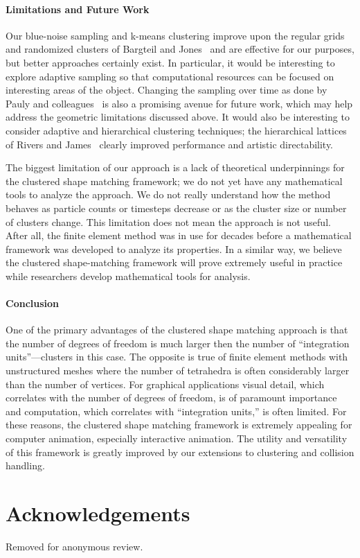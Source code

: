 \documentclass[review]{acmsiggraph}
\begin{document}
\paragraph{Limitations and Future Work}

Our blue-noise sampling and k-means clustering improve upon the regular grids and
randomized clusters of Bargteil and Jones~ and are effective for our purposes,
but better approaches certainly exist.  In particular, it would be interesting to explore adaptive sampling
so that computational resources can be focused on interesting areas of the object.  
Changing the sampling over time as done by Pauly and colleagues~
is also a promising avenue for future work, which may help address the geometric limitations discussed above.
It would also be interesting
to consider adaptive and hierarchical clustering techniques; the hierarchical lattices of Rivers and James~\cite{Rivers:2007:FFL}
clearly improved performance and artistic directability.  

The biggest limitation of our approach is a lack of theoretical underpinnings for the clustered shape matching
framework; we do not yet have any mathematical tools to analyze the approach.  We do not really understand
how the method behaves as particle counts or timesteps decrease or as the cluster size or number of clusters change.
This limitation does not mean the approach is not useful.  After all, the finite element method was in use
for decades before a mathematical framework was developed to analyze its properties.  In a similar way,
we believe the clustered shape-matching framework will prove extremely useful in practice while
researchers develop mathematical tools for analysis. 

\paragraph{Conclusion} 
One of the primary advantages of the clustered shape matching approach is that the number of degrees of freedom
is much larger then the number of ``integration units''---clusters in this case.  The opposite is true of finite element
methods with unstructured meshes where the number of tetrahedra is often considerably larger than the number of vertices.  
For graphical applications visual detail, which correlates with the number of degrees of freedom, is of paramount importance
and computation, which correlates with ``integration units,'' is often limited.  
For these reasons, the clustered shape matching framework is extremely appealing for computer animation, 
especially interactive animation.  The utility and versatility of this framework is greatly improved by our extensions 
to clustering and collision handling.




\section*{Acknowledgements}
Removed for anonymous review.



\end{document}
